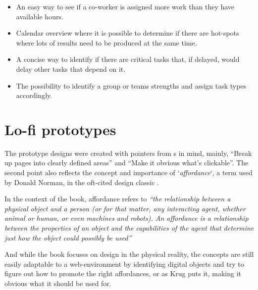 {  \newcommand{\ideaOne}{%
    An easy way to see if a co-worker is assigned more work than they have
    available hours.%
  }

  \newcommand{\ideaTwo}{%
    Calendar overview where it is possible to determine if there are
    hot-spots where lots of results need to be produced at the same
    time.%
  }

  \newcommand{\ideaThree}{%
    A concise way to identify if there are critical tasks that, if
    delayed, would delay other tasks that depend on it.%
  }

  \newcommand{\ideaFour}{%
    The possibility to identify a group or teams strengths and assign
    task types accordingly.%
  }

  \begin{itemize}
    \item{\ideaOne\label{label_ideas}}
    \item{\ideaTwo}
    \item{\ideaThree}
    \item{\ideaFour}
  \end{itemize}


\section{Lo-fi prototypes}

  The prototype designs were created with pointers from
  \citeauthor{citeDonMakeMeThink}s
  \cite{citeDonMakeMeThink} in mind, mainly,
  ``Break up pages into clearly defined areas'' and ``Make it obvious what's
  clickable''. The second point also reflects the concept and importance of
  `\textit{affordance}`, a term used by Donald Norman, in the oft-cited design classic
  \cite{citeTheDesignOfEverydayThings}.

  In the context of the book, affordance refers to
  \textit{%
  ``the relationship between a physical object
  and a person (or for that matter, any interacting agent, whether animal or
  human, or even machines and robots). An affordance is a relationship
  between the properties of an object and the capabilities of the agent that
  determine just how the object could possibly be used''
  }\cite[p. 11]{citeTheDesignOfEverydayThings}

  And while the book focuses on design in the physical reality, the concepts
  are still easily adaptable to a web-environment by identifying digital objects and
  try to figure out how to promote the right affordances, or as Krug puts it, making
  it obvious what it should be used for.

}
